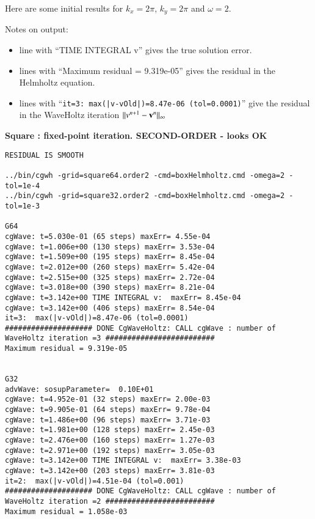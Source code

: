 \documentclass[preprint,11pt]{elsarticle}
\begin{document}
Here are some initial results for $k_x=2\pi$, $k_y=2\pi$ and $\omega=2$. 

\noindent Notes on output: 
\begin{itemize}
  \item line with ``TIME INTEGRAL v'' gives the true solution error.
  \item lines with ``Maximum residual = 9.319e-05'' gives the residual in the Helmholtz equation.
  \item lines with ``\texttt{it=3:  max(|v-vOld|)=8.47e-06 (tol=0.0001)}'' give the residual in the
        WaveHoltz iteration $\| v^{n+1} - \mathbf{ v}^{n} \|_\infty$
\end{itemize}


\bigskip
\textbf{Square : fixed-point iteration. SECOND-ORDER - looks OK}
\begin{Verbatim}[fontsize=\scriptsize]
RESIDUAL IS SMOOTH

../bin/cgwh -grid=square64.order2 -cmd=boxHelmholtz.cmd -omega=2 -tol=1e-4
../bin/cgwh -grid=square32.order2 -cmd=boxHelmholtz.cmd -omega=2 -tol=1e-3

G64
cgWave: t=5.030e-01 (65 steps) maxErr= 4.55e-04
cgWave: t=1.006e+00 (130 steps) maxErr= 3.53e-04
cgWave: t=1.509e+00 (195 steps) maxErr= 8.45e-04
cgWave: t=2.012e+00 (260 steps) maxErr= 5.42e-04
cgWave: t=2.515e+00 (325 steps) maxErr= 2.72e-04
cgWave: t=3.018e+00 (390 steps) maxErr= 8.21e-04
cgWave: t=3.142e+00 TIME INTEGRAL v:  maxErr= 8.45e-04
cgWave: t=3.142e+00 (406 steps) maxErr= 8.54e-04
it=3:  max(|v-vOld|)=8.47e-06 (tol=0.0001)
#################### DONE CgWaveHoltz: CALL cgWave : number of WaveHoltz iteration =3 #########################
Maximum residual = 9.319e-05


G32
advWave: sosupParameter=  0.10E+01
cgWave: t=4.952e-01 (32 steps) maxErr= 2.00e-03
cgWave: t=9.905e-01 (64 steps) maxErr= 9.78e-04
cgWave: t=1.486e+00 (96 steps) maxErr= 3.71e-03
cgWave: t=1.981e+00 (128 steps) maxErr= 2.45e-03
cgWave: t=2.476e+00 (160 steps) maxErr= 1.27e-03
cgWave: t=2.971e+00 (192 steps) maxErr= 3.05e-03
cgWave: t=3.142e+00 TIME INTEGRAL v:  maxErr= 3.38e-03
cgWave: t=3.142e+00 (203 steps) maxErr= 3.81e-03
it=2:  max(|v-vOld|)=4.51e-04 (tol=0.001)
#################### DONE CgWaveHoltz: CALL cgWave : number of WaveHoltz iteration =2 #########################
Maximum residual = 1.058e-03
\end{Verbatim}
\end{document}
